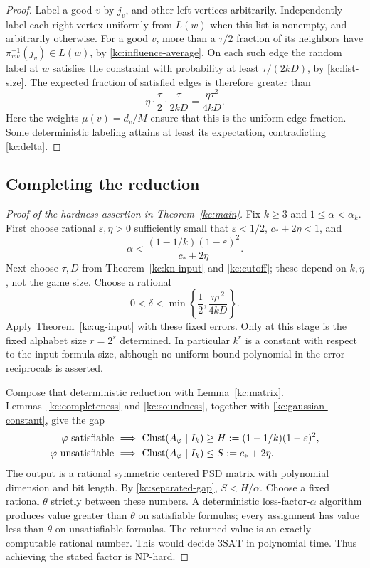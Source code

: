 \begin{proof}
Label a good \(v\) by \(j_v\), and other left vertices arbitrarily.
Independently label each right vertex uniformly from \(L(w)\)
when this list is nonempty, and arbitrarily otherwise.
For a good \(v\), more than a \(\tau/2\) fraction of its
neighbors have \(\pi_{vw}^{-1}(j_v)\in L(w)\), by
\eqref{kc:influence-average}. On each such edge the random label
at \(w\) satisfies the constraint with probability at least
\(\tau/(2kD)\), by \eqref{kc:list-size}.
The expected fraction of satisfied edges is therefore greater than
\[
 \eta\cdot\frac{\tau}{2}\cdot\frac{\tau}{2kD}
   =\frac{\eta\tau^2}{4kD}.
\]
Here the weights \(\mu(v)=d_v/M\) ensure that this is the
uniform-edge fraction. Some deterministic labeling attains at
least its expectation, contradicting \eqref{kc:delta}.
\end{proof}

\subsection{Completing the reduction}

\begin{proof}[Proof of the hardness assertion in Theorem~\ref{kc:main}]
Fix \(k\ge3\) and \(1\le\alpha<\alpha_k\).
First choose rational \(\varepsilon,\eta>0\) sufficiently small
that \(\varepsilon<1/2\), \(c_*+2\eta<1\), and
\begin{equation}\label{kc:separated-gap}
 \alpha<
 \frac{(1-1/k)(1-\varepsilon)^2}{c_*+2\eta}.
\end{equation}
Next choose \(\tau,D\) from Theorem~\ref{kc:kn-input} and
\eqref{kc:cutoff}; these depend on \(k,\eta\), not the game size.
Choose a rational
\[
 0<\delta<
 \min\left\{\frac12,\frac{\eta\tau^2}{4kD}\right\}.
\]
Apply Theorem~\ref{kc:ug-input} with these fixed errors.
Only at this stage is the fixed alphabet size \(r=2^s\)
determined. In particular \(k^r\) is a constant with respect to
the input formula size, although no uniform bound polynomial in
the error reciprocals is asserted.

Compose that deterministic reduction with Lemma~\ref{kc:matrix}.
Lemmas~\ref{kc:completeness} and \ref{kc:soundness}, together with
\eqref{kc:gaussian-constant}, give the gap
\[
 \begin{aligned}
 \varphi\text{ satisfiable}
 &\ \Longrightarrow\
 \operatorname{Clust}(A_\varphi\mid I_k)\ge
       H:=(1-1/k)(1-\varepsilon)^2,\\
 \varphi\text{ unsatisfiable}
 &\ \Longrightarrow\
 \operatorname{Clust}(A_\varphi\mid I_k)\le
       S:=c_*+2\eta .
 \end{aligned}
\]
The output is a rational symmetric centered PSD matrix with
polynomial dimension and bit length. By \eqref{kc:separated-gap},
\(S<H/\alpha\). Choose a fixed rational
\(\theta\) strictly between these numbers.
A deterministic loss-factor-\(\alpha\) algorithm produces value
greater than \(\theta\) on satisfiable formulas; every assignment
has value less than \(\theta\) on unsatisfiable formulas.
The returned value is an exactly computable rational number.
This would decide \(\mathrm{3SAT}\) in polynomial time.
Thus achieving the stated factor is NP-hard.
\end{proof}


